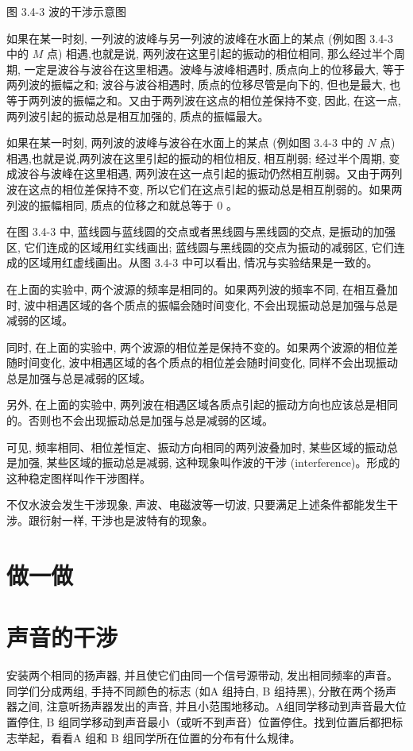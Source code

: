 \documentclass[10pt]{article}
\begin{document}
图 3.4-3 波的干涉示意图

如果在某一时刻, 一列波的波峰与另一列波的波峰在水面上的某点 (例如图 3.4-3 中的 \(M\) 点) 相遇,也就是说, 两列波在这里引起的振动的相位相同, 那么经过半个周期, 一定是波谷与波谷在这里相遇。波峰与波峰相遇时, 质点向上的位移最大, 等于两列波的振幅之和; 波谷与波谷相遇时, 质点的位移尽管是向下的, 但也是最大, 也等于两列波的振幅之和。又由于两列波在这点的相位差保持不变, 因此, 在这一点, 两列波引起的振动总是相互加强的, 质点的振幅最大。

如果在某一时刻, 两列波的波峰与波谷在水面上的某点 (例如图 3.4-3 中的 \(N\) 点) 相遇,也就是说,两列波在这里引起的振动的相位相反, 相互削弱; 经过半个周期, 变成波谷与波峰在这里相遇, 两列波在这一点引起的振动仍然相互削弱。又由于两列波在这点的相位差保持不变, 所以它们在这点引起的振动总是相互削弱的。如果两列波的振幅相同, 质点的位移之和就总等于 0 。

在图 3.4-3 中, 蓝线圆与蓝线圆的交点或者黑线圆与黑线圆的交点, 是振动的加强区, 它们连成的区域用红实线画出; 蓝线圆与黑线圆的交点为振动的减弱区, 它们连成的区域用红虚线画出。从图 3.4-3 中可以看出, 情况与实验结果是一致的。

在上面的实验中, 两个波源的频率是相同的。如果两列波的频率不同, 在相互叠加时, 波中相遇区域的各个质点的振幅会随时间变化, 不会出现振动总是加强与总是减弱的区域。

同时, 在上面的实验中, 两个波源的相位差是保持不变的。如果两个波源的相位差随时间变化, 波中相遇区域的各个质点的相位差会随时间变化, 同样不会出现振动总是加强与总是减弱的区域。

另外, 在上面的实验中, 两列波在相遇区域各质点引起的振动方向也应该总是相同的。否则也不会出现振动总是加强与总是减弱的区域。

可见, 频率相同、相位差恒定、振动方向相同的两列波叠加时, 某些区域的振动总是加强, 某些区域的振动总是减弱, 这种现象叫作波的干涉 (interference)。形成的这种稳定图样叫作干涉图样。

不仅水波会发生干涉现象, 声波、电磁波等一切波, 只要满足上述条件都能发生干涉。跟衍射一样, 干涉也是波特有的现象。

\section*{做一做}

\section*{声音的干涉}

安装两个相同的扬声器, 并且使它们由同一个信号源带动, 发出相同频率的声音。 同学们分成两组, 手持不同颜色的标志 (如A 组持白, B 组持黑), 分散在两个扬声器之间, 注意听扬声器发出的声音, 并且小范围地移动。A组同学移动到声音最大位置停住, \(\mathrm{B}\) 组同学移动到声音最小（或听不到声音）位置停住。找到位置后都把标志举起，看看A 组和 \(\mathrm{B}\) 组同学所在位置的分布有什么规律。
\end{document}
